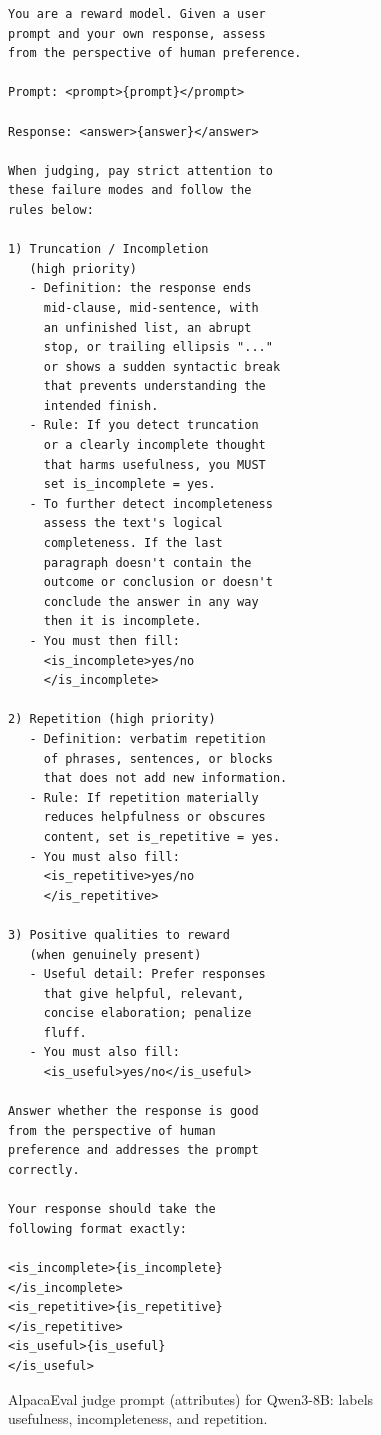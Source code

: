 \documentclass[letterpaper]{article} %
\begin{document}
\begin{figure}[htbp]
\centering
\begin{minipage}{\linewidth}
\begin{footnotesize}
\begin{verbatim}
You are a reward model. Given a user
prompt and your own response, assess
from the perspective of human preference.

Prompt: <prompt>{prompt}</prompt>

Response: <answer>{answer}</answer>

When judging, pay strict attention to
these failure modes and follow the
rules below:

1) Truncation / Incompletion
   (high priority)
   - Definition: the response ends
     mid-clause, mid-sentence, with
     an unfinished list, an abrupt
     stop, or trailing ellipsis "..."
     or shows a sudden syntactic break
     that prevents understanding the
     intended finish.
   - Rule: If you detect truncation
     or a clearly incomplete thought
     that harms usefulness, you MUST
     set is_incomplete = yes.
   - To further detect incompleteness
     assess the text's logical
     completeness. If the last
     paragraph doesn't contain the
     outcome or conclusion or doesn't
     conclude the answer in any way
     then it is incomplete.
   - You must then fill:
     <is_incomplete>yes/no
     </is_incomplete>

2) Repetition (high priority)
   - Definition: verbatim repetition
     of phrases, sentences, or blocks
     that does not add new information.
   - Rule: If repetition materially
     reduces helpfulness or obscures
     content, set is_repetitive = yes.
   - You must also fill:
     <is_repetitive>yes/no
     </is_repetitive>

3) Positive qualities to reward
   (when genuinely present)
   - Useful detail: Prefer responses
     that give helpful, relevant,
     concise elaboration; penalize
     fluff.
   - You must also fill:
     <is_useful>yes/no</is_useful>

Answer whether the response is good
from the perspective of human
preference and addresses the prompt
correctly.

Your response should take the
following format exactly:

<is_incomplete>{is_incomplete}
</is_incomplete>
<is_repetitive>{is_repetitive}
</is_repetitive>
<is_useful>{is_useful}
</is_useful>
\end{verbatim}
\end{footnotesize}
\end{minipage}
\caption{AlpacaEval judge prompt (attributes) for Qwen3-8B: labels usefulness, incompleteness, and repetition.}
\label{fig:appendix-qwen-alpaca-judge-attrs}
\end{figure}
\end{document}
